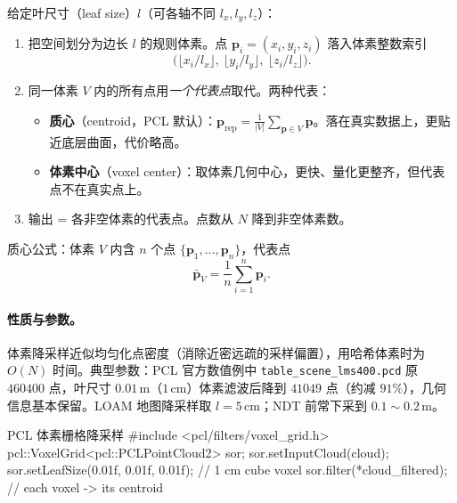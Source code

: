 \begin{algo}[体素栅格降采样]\label{alg:pc-voxel}
给定叶尺寸（leaf size）$l$（可各轴不同 $l_x,l_y,l_z$）：
\begin{enumerate}
  \item 把空间划分为边长 $l$ 的规则体素。点 $\mathbf{p}_i=(x_i,y_i,z_i)$ 落入体素整数索引
  \begin{equation}
    \big(\lfloor x_i/l_x\rfloor,\ \lfloor y_i/l_y\rfloor,\ \lfloor z_i/l_z\rfloor\big).
    \label{eq:pc-voxel-index}
  \end{equation}
  \item 同一体素 $V$ 内的所有点用\emph{一个代表点}取代。两种代表：
  \begin{itemize}
    \item \textbf{质心}（centroid，PCL 默认）：$\displaystyle\mathbf{p}_{\text{rep}}=\frac{1}{|V|}\sum_{\mathbf{p}\in V}\mathbf{p}$。落在真实数据上，更贴近底层曲面，代价略高。
    \item \textbf{体素中心}（voxel center）：取体素几何中心，更快、量化更整齐，但代表点不在真实点上。
  \end{itemize}
  \item 输出 = 各非空体素的代表点。点数从 $N$ 降到非空体素数。
\end{enumerate}
质心公式：体素 $V$ 内含 $n$ 个点 $\{\mathbf{p}_1,\dots,\mathbf{p}_n\}$，代表点
\begin{equation}
  \bar{\mathbf{p}}_V=\frac{1}{n}\sum_{i=1}^{n}\mathbf{p}_i.
  \label{eq:pc-centroid}
\end{equation}
\end{algo}

\paragraph{性质与参数。}
体素降采样近似均匀化点密度（消除近密远疏的采样偏置），用哈希体素时为 $O(N)$ 时间\cite{magnusson2009ndt}。典型参数：PCL 官方数值例中 \texttt{table\_scene\_lms400.\allowbreak pcd} 原 $460400$ 点，叶尺寸 $0.01\,\mathrm{m}$（$1\,\mathrm{cm}$）体素滤波后降到 $41049$ 点（约减 $91\%$），几何信息基本保留\cite{rusu2011pcl}。LOAM 地图降采样取 $l=5\,\mathrm{cm}$\cite{zhang2014loam}；NDT 前常下采到 $0.1\sim0.2\,\mathrm{m}$\cite{magnusson2009ndt}。

\begin{codebox}[C++]{PCL 体素栅格降采样}
#include <pcl/filters/voxel_grid.h>
pcl::VoxelGrid<pcl::PCLPointCloud2> sor;
sor.setInputCloud(cloud);
sor.setLeafSize(0.01f, 0.01f, 0.01f);   // 1 cm cube voxel
sor.filter(*cloud_filtered);            // each voxel -> its centroid
\end{codebox}

